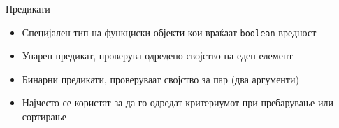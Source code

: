 \begin{frame}{Предикати}
\begin{itemize}
  \item Специјален тип на функциски објекти кои враќаат \texttt{boolean} вредност
  \item Унарен предикат, проверува одредено својство на еден елемент 
  \item Бинарни предикати, проверуваат својство за пар  (два аргументи)
  \item Најчесто се користат за да го одредат критериумот при пребарување или
  сортирање
\end{itemize}
\end{frame}
